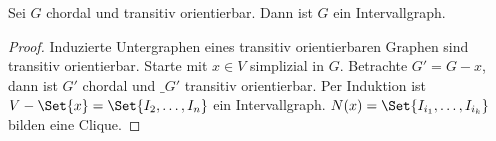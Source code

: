 \begin{st}
    Sei $G$ chordal und transitiv orientierbar.
    Dann ist $G$ ein Intervallgraph.
    \begin{proof}
        Induzierte Untergraphen eines transitiv orientierbaren Graphen sind transitiv orientierbar.
        Starte mit $x \in V$ simplizial in $G$.
        Betrachte $G' = G - x$, dann ist $G'$ chordal und $\_{G'}$ transitiv orientierbar.
        Per Induktion ist $V - \Set{x} = \Set{I_2, \dotsc, I_n}$ ein Intervallgraph.
        $N(x) = \Set{I_{i_1}, \dotsc, I_{i_k}}$ bilden eine Clique.
    \end{proof}
\end{st}




